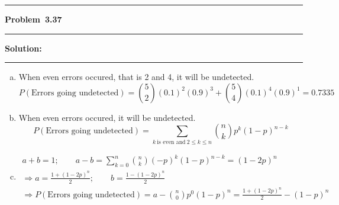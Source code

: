 \documentclass[10.5pt]{article}
\newcommand\question[1]{\vspace{.2in}\hrule\vspace{0.04in}\textbf{Problem\ #1}\vspace{.4em}\hrule\vspace{.10in}}
\newcommand\Solution{\vspace{.3in}\textbf{Solution:}\vspace{.5em}\hrule\vspace{.08in}\par}
\begin{document}
\question{3.37}
	\Solution{}
	\begin{enumerate}[(a)]
		\item When even errors occured, that is 2 and 4, it will be undetected.
		$$P(\text{Errors going undetected}) = \binom{5}{2}(0.1)^2(0.9)^3+\binom{5}{4}(0.1)^4(0.9)^1 = 0.7335$$
		\vspace{0.5cm}
		\item When even errors occured, it will be undetected.
		$$P(\text{Errors going undetected}) = \sum_{k\ \text{is even and}\ 2\leqslant k\leqslant n} \binom{n}{k}p^k(1-p)^{n-k}$$
		\vspace{0.5cm}
		\item \begin{gather*}
			a+b = 1;\qquad a-b = \sum_{k = 0}^n \binom{n}{k}(-p)^k(1-p)^{n-k} = (1-2p)^n\\[6pt]
			\Rightarrow a = \frac{1+(1-2p)^n}{2};\qquad b = \frac{1 - (1-2p)^n}{2}\\[6pt]
			\Rightarrow P(\text{Errors going undetected}) = a - \binom{n}{0}p^0(1-p)^n = \frac{1+(1-2p)^n}{2}-(1-p)^n
		\end{gather*}
	\end{enumerate}

\vspace{1cm}
\end{document}
